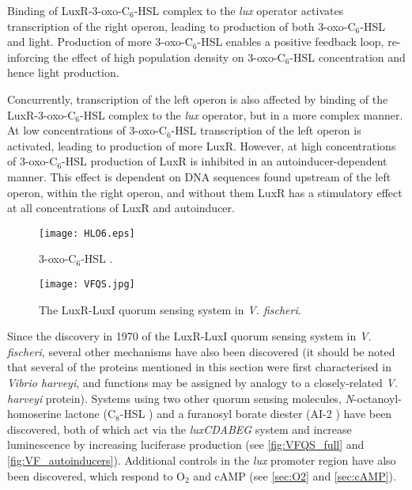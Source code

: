 Binding of LuxR-3-oxo-C$_6$-HSL complex to the \textit{lux} operator activates transcription of the right operon, leading to production of both 3-oxo-C$_6$-HSL  and light. Production of more 3-oxo-C$_6$-HSL  enables a positive feedback loop, re-inforcing the effect of high population density on 3-oxo-C$_6$-HSL  concentration and hence light production.

Concurrently, transcription of the left operon is also affected by binding of the LuxR-3-oxo-C$_6$-HSL complex to the \textit{lux} operator, but in a more complex manner. At low concentrations of 3-oxo-C$_6$-HSL  transcription of the left operon is activated, leading to production of more LuxR.
However, at high concentrations of 3-oxo-C$_6$-HSL  production of LuxR is inhibited in an autoinducer-dependent manner\cite{Dunlap1989}. This effect is dependent on DNA sequences found upstream of the left operon, within the right operon, and without them LuxR has a stimulatory effect at all concentrations of LuxR and autoinducer.




\begin{figure}[H]
	\begin{center}
		\texttt{[image: HLO6.eps]}
		\caption{3-oxo-C$_6$-HSL . \label{fig:HLO6}}
	\end{center}
\end{figure}

\begin{figure}[H]
	\begin{center}
		\texttt{[image: VFQS.jpg]}
		\caption{The LuxR-LuxI quorum sensing system in \textit{V. fischeri}. \label{fig:VF_QS}}
	\end{center}
\end{figure}


Since the discovery in 1970 of the LuxR-LuxI quorum sensing system in \textit{V. fischeri}, several other mechanisms have also been discovered (it should be noted that several of the proteins mentioned in this section were first characterised in \textit{Vibrio harveyi}, and functions may be assigned by analogy to a closely-related \textit{V. harveyi} protein\cite{Miyashiro2012}). Systems using two other quorum sensing molecules, \textit{N}-octanoyl-homoserine lactone (C$_8$-HSL ) and a furanosyl borate diester (AI-2 ) have been discovered, both of which act via the \textit{luxCDABEG} system and increase luminescence by increasing luciferase production\cite{Miyashiro2012,Verma2013} (see \ref{fig:VFQS_full} and \ref{fig:VF_autoinducers}).
Additional controls in the \textit{lux} promoter region have also been discovered, which respond to O$_2$ and cAMP\cite{Miyashiro2012} (see \ref{sec:O2} and \ref{sec:cAMP}). 

